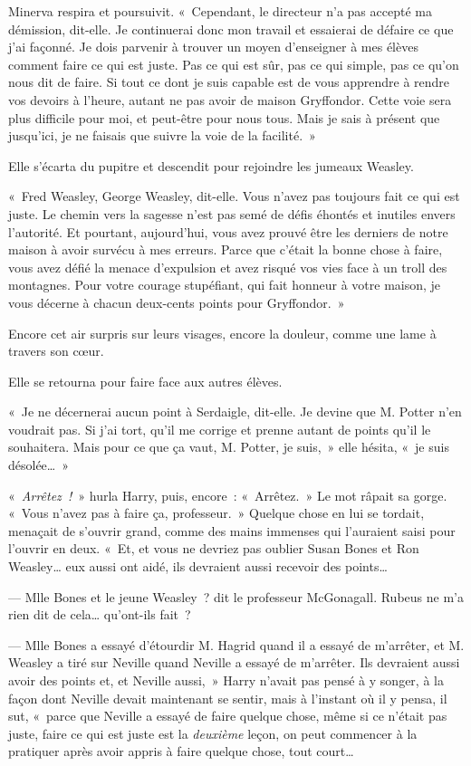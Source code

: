 Minerva respira et poursuivit. «~Cependant, le directeur n'a pas accepté ma démission, dit-elle. Je continuerai donc mon travail et essaierai de défaire ce que j'ai façonné. Je dois parvenir à trouver un moyen d'enseigner à mes élèves comment faire ce qui est juste. Pas ce qui est sûr, pas ce qui simple, pas ce qu'on nous dit de faire. Si tout ce dont je suis capable est de vous apprendre à rendre vos devoirs à l'heure, autant ne pas avoir de maison Gryffondor. Cette voie sera plus difficile pour moi, et peut-être pour nous tous. Mais je sais à présent que jusqu'ici, je ne faisais que suivre la voie de la facilité.~»

Elle s'écarta du pupitre et descendit pour rejoindre les jumeaux Weasley.

«~Fred Weasley, George Weasley, dit-elle. Vous n'avez pas toujours fait ce qui est juste. Le chemin vers la sagesse n'est pas semé de défis éhontés et inutiles envers l'autorité. Et pourtant, aujourd'hui, vous avez prouvé être les derniers de notre maison à avoir survécu à mes erreurs. Parce que c'était la bonne chose à faire, vous avez défié la menace d'expulsion et avez risqué vos vies face à un troll des montagnes. Pour votre courage stupéfiant, qui fait honneur à votre maison, je vous décerne à chacun deux-cents points pour Gryffondor.~»

Encore cet air surpris sur leurs visages, encore la douleur, comme une lame à travers son cœur.

Elle se retourna pour faire face aux autres élèves.

«~Je ne décernerai aucun point à Serdaigle, dit-elle. Je devine que M. Potter n'en voudrait pas. Si j'ai tort, qu'il me corrige et prenne autant de points qu'il le souhaitera. Mais pour ce que ça vaut, M. Potter, je suis,~» elle hésita, «~je suis désolée…~»

\later

«~\emph{Arrêtez~!}~» hurla Harry, puis, encore~: «~Arrêtez.~» Le mot râpait sa gorge. «~Vous n'avez pas à faire ça, professeur.~» Quelque chose en lui se tordait, menaçait de s'ouvrir grand, comme des mains immenses qui l'auraient saisi pour l'ouvrir en deux. «~Et, et vous ne devriez pas oublier Susan Bones et Ron Weasley… eux aussi ont aidé, ils devraient aussi recevoir des points…

--- Mlle Bones et le jeune Weasley~? dit le professeur McGonagall. Rubeus ne m'a rien dit de cela… qu'ont-ils fait~?

--- Mlle Bones a essayé d'étourdir M. Hagrid quand il a essayé de m'arrêter, et M. Weasley a tiré sur Neville quand Neville a essayé de m'arrêter. Ils devraient aussi avoir des points et, et Neville aussi,~» Harry n'avait pas pensé à y songer, à la façon dont Neville devait maintenant se sentir, mais à l'instant où il y pensa, il sut, «~parce que Neville a essayé de faire quelque chose, même si ce n'était pas juste, faire ce qui est juste est la \emph{deuxième} leçon, on peut commencer à la pratiquer après avoir appris à faire quelque chose, tout court…

